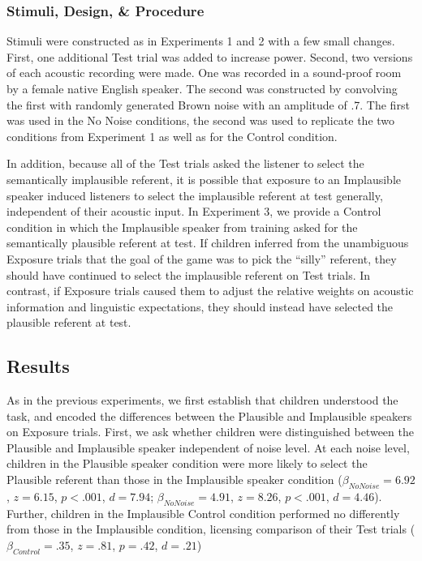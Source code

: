 \documentclass[man,floatsintext]{apa6}
\begin{document}
\subsubsection{Stimuli, Design, \& Procedure}

Stimuli were constructed as in Experiments 1 and 2 with a few small changes. First, one additional Test trial was added to increase power. Second, two versions of each acoustic recording were made. One was recorded in a sound-proof room by a female native English speaker. The second was constructed by convolving the first with randomly generated Brown noise with an amplitude of .7. The first was used in the No Noise conditions, the second was used to replicate the two conditions from Experiment 1 as well as for the Control condition.

In addition, because all of the Test trials asked the listener to select the semantically implausible referent, it is possible that exposure to an Implausible speaker induced listeners to select the implausible referent at test generally, independent of their acoustic input.  In Experiment 3, we provide a Control condition in which the Implausible speaker from training asked for the semantically plausible referent at test. If children inferred from the unambiguous Exposure trials that the goal of the game was to pick the ``silly'' referent, they should have continued to select the implausible referent on Test trials. In contrast, if Exposure trials caused them to adjust the relative weights on acoustic information and linguistic expectations, they should instead have selected the plausible referent at test.

\subsection{Results}

As in the previous experiments, we first establish that children understood the task, and encoded the differences between the Plausible and Implausible speakers on Exposure trials. First, we ask whether children were distinguished between the Plausible and Implausible speaker independent of noise level. At each noise level, children in the Plausible speaker condition were more likely to select the Plausible referent than those in the Implausible speaker condition ($\beta_{No Noise} = 6.92$, $z =6.15$, $p < .001$, $d = 7.94$; $\beta_{No Noise} = 4.91$, $z =8.26$, $p < .001$, $d = 4.46$). Further, children in the Implausible Control condition performed no differently from those in the Implausible condition, licensing comparison of their Test trials ($\beta_{Control} = .35$, $z =.81$, $p = .42$, $d = .21$)
\end{document}
